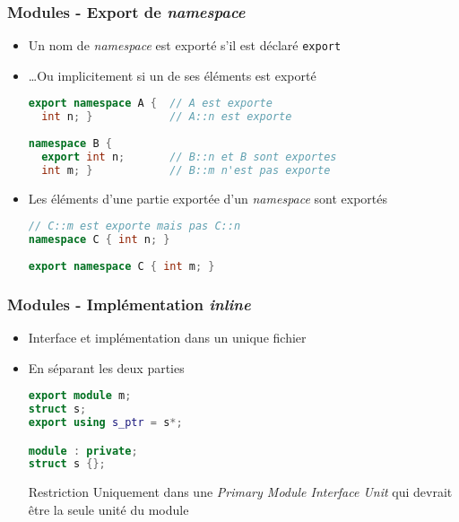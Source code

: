 \documentclass[C++.tex]{subfiles}
\begin{document}
\begin{frame}[fragile]
	\frametitle{Modules - Export de \textit{namespace}}
	\begin{itemize}
		\item Un nom de \textit{namespace} est exporté s'il est déclaré \lstinline|export|
		\item \ldots Ou implicitement si un de ses éléments est exporté
	
		\begin{lstlisting}[language=C++]
export namespace A {  // A est exporte
  int n; }            // A::n est exporte
	
namespace B {
  export int n;       // B::n et B sont exportes
  int m; }            // B::m n'est pas exporte\end{lstlisting}
	
		\item Les éléments d'une partie exportée d'un \textit{namespace} sont exportés
	
		\begin{lstlisting}[language=C++]
// C::m est exporte mais pas C::n
namespace C { int n; }
	
export namespace C { int m; }\end{lstlisting}
	\end{itemize}
\end{frame}

\begin{frame}[fragile]
	\frametitle{Modules - Implémentation \textit{inline}}
	\begin{itemize}
		\item Interface et implémentation dans un unique fichier
		\item En séparant les deux parties

		\begin{lstlisting}[language=C++]
export module m;
struct s;
export using s_ptr = s*;

module : private;
struct s {};\end{lstlisting}

		\pause

		\begin{alertblock}{Restriction}
			Uniquement dans une \textit{Primary Module Interface Unit} qui devrait être la seule unité du module
		\end{alertblock}
	\end{itemize}
\end{frame}
\end{document}
